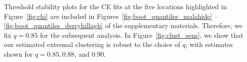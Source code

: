 \documentclass[12pt,compact]{article}
\begin{document}
Threshold stability plots for the CE fits at the five locations highlighted in Figure~\ref{fig:chi} are included in Figures~\ref{fig:boot_quantiles_malahide} -- \ref{fig:boot_quantiles_derryhillagh} of the supplementary materials.
Therefore, we fix $q = 0.85$ for the subsequent analysis.
In Figure~\ref{fig:clust_sens}, we show that our estimated extremal clustering is robust to the choice of $q$, with estimates shown for $q = 0.85, 0.88$, and $0.90$.

\end{document}
